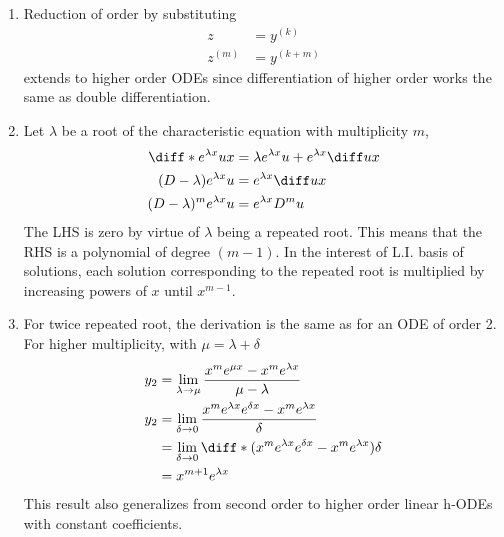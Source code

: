 \begin{enumerate}
\begin{enumerate}
              \item Reduction of order by substituting
                    \begin{align}
                        z       & = y^{(k)}   \\
                        z^{(m)} & = y^{(k+m)}
                    \end{align}
                    extends to higher order ODEs since differentiation of higher order works the
                    same as double differentiation.

              \item Let $ \lambda $ be a root of the characteristic equation with multiplicity
                    $ m $,
                    \begin{align}
                        \diff* {e^{\lambda x}u}{x}        & = \lambda e^{\lambda x}u + e^{\lambda x}\diff ux \\
                        (D - \lambda) e^{\lambda x} u     & = e^{\lambda x} \diff ux                         \\
                        (D - \lambda)^{m} e^{\lambda x} u & = e^{\lambda x}D^{m}u
                    \end{align}
                    The LHS is zero by virtue of $ \lambda $ being a repeated root. This means that
                    the RHS is a polynomial of degree $ (m-1) $.
                    In the interest of L.I. basis of solutions, each solution corresponding to the
                    repeated root is multiplied by increasing powers of $ x $ until $ x^{m-1} $.

              \item For twice repeated root, the derivation is the same as for an ODE of order
                    2. For higher multiplicity, with $ \mu = \lambda + \delta $
                    \begin{align}
                        y_{2} & = \lim_{\lambda \rightarrow \mu} \frac{x^{m}e^{\mu x} - x^{m}e^{\lambda x}}{\mu - \lambda}           \\
                        y_{2} & = \lim_{\delta \rightarrow 0} \frac{x^{m}e^{\lambda x}e^{\delta x} - x^{m}e^{\lambda x}}{\delta}     \\
                              & = \lim_{\delta \rightarrow 0} \diff* {(x^{m}e^{\lambda x}e^{\delta x} - x^{m}e^{\lambda x})}{\delta} \\
                              & = x^{m+1}e^{\lambda x}
                    \end{align}
                    This result also generalizes from second order to higher order linear h-ODEs with constant
                    coefficients.
          \end{enumerate}


\end{enumerate}
